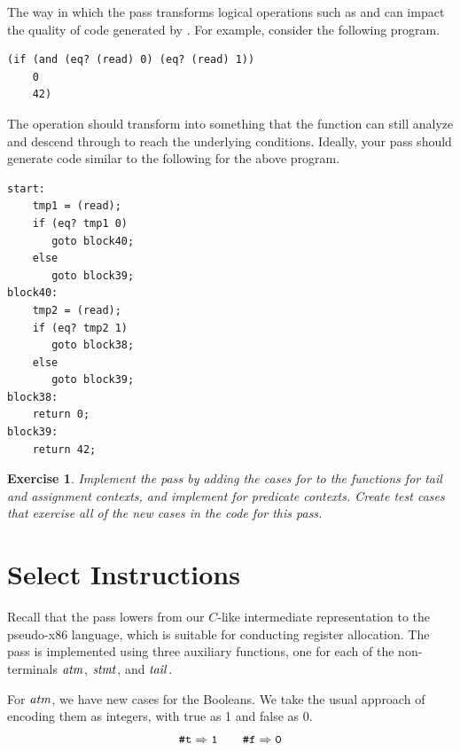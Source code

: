 \documentclass[11pt]{book}
\newtheorem{exercise}[theorem]{Exercise}
\begin{document}
The way in which the  pass transforms logical operations
such as  and  can impact the quality of code
generated by . For example, consider the
following program.
\begin{lstlisting}
(if (and (eq? (read) 0) (eq? (read) 1))
    0
    42)  
\end{lstlisting}
The  operation should transform into something that the
 function can still analyze and descend through to
reach the underlying  conditions. Ideally, your
 pass should generate code similar to the
following for the above program.
\begin{center}
\begin{lstlisting}
start:
    tmp1 = (read);
    if (eq? tmp1 0)
       goto block40;
    else
       goto block39;
block40:
    tmp2 = (read);
    if (eq? tmp2 1)
       goto block38;
    else
       goto block39;
block38:
    return 0;
block39:
    return 42;
\end{lstlisting}
\end{center}

\begin{exercise}\normalfont
  Implement the pass  by adding the cases for
   to the functions for tail and assignment contexts, and
  implement  for predicate contexts. Create test
  cases that exercise all of the new cases in the code for this pass.
\end{exercise}


\section{Select Instructions}
\label{sec:select-r2}

Recall that the  pass lowers from our
$C$-like intermediate representation to the pseudo-x86 language, which
is suitable for conducting register allocation. The pass is
implemented using three auxiliary functions, one for each of the
non-terminals $\mathit{atm}$, $\mathit{stmt}$, and $\mathit{tail}$.

For $\mathit{atm}$, we have new cases for the Booleans.  We take the usual
approach of encoding them as integers, with true as 1 and false as 0.
\[
\texttt{\#t} \Rightarrow \texttt{1}
\qquad
\texttt{\#f} \Rightarrow \texttt{0}
\]
\end{document}
